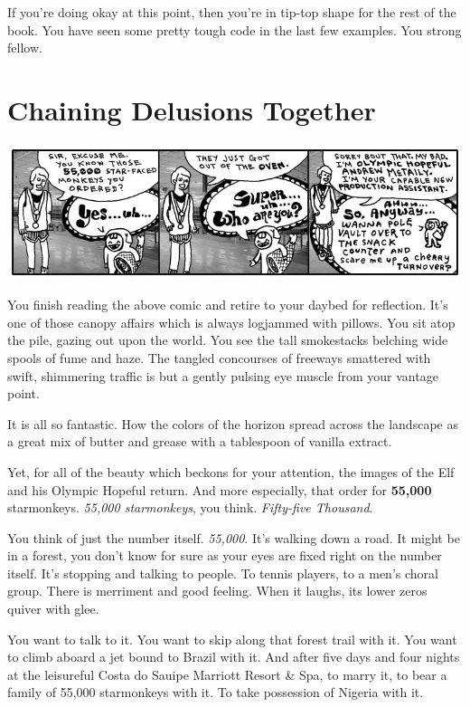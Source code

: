 \documentclass[10pt,twoside]{report}
\begin{document}
If you're doing okay at this point, then you're in tip-top shape for
the rest of the book.  You have seen some pretty tough code in the
last few examples.  You strong fellow.


\section{Chaining Delusions Together}


	\includegraphics[width=1.0\textwidth]{cache/29.png}

You finish reading the above comic and retire to your daybed for
reflection. It's one of those canopy affairs which is always logjammed
with pillows.  You sit atop the pile, gazing out upon the world.  You
see the tall smokestacks belching wide spools of fume and haze.  The
tangled concourses of freeways smattered with swift, shimmering
traffic is but a gently pulsing eye muscle from your vantage point.

It is all so fantastic.  How the colors of the horizon spread across
the landscape as a great mix of butter and grease with a tablespoon of
vanilla extract.

Yet, for all of the beauty which beckons for your attention, the
images of the Elf and his Olympic Hopeful return.  And more
especially, that order for {\bf 55,000} starmonkeys.  {\em 55,000
  starmonkeys}, you think.  {\em Fifty-five Thousand}.

You think of just the number itself.  {\em 55,000}.  It's walking down
a road.  It might be in a forest, you don't know for sure as your eyes
are fixed right on the number itself.  It's stopping and talking to
people.  To tennis players, to a men's choral group.  There is
merriment and good feeling.  When it laughs, its lower zeros quiver
with glee.

You want to talk to it.  You want to skip along that forest trail with
it.  You want to climb aboard a jet bound to Brazil with it.  And
after five days and four nights at the leisureful Costa do Sauipe
Marriott Resort \& Spa, to marry it, to bear a family of 55,000
starmonkeys with it. To take possession of Nigeria with it.
\end{document}
